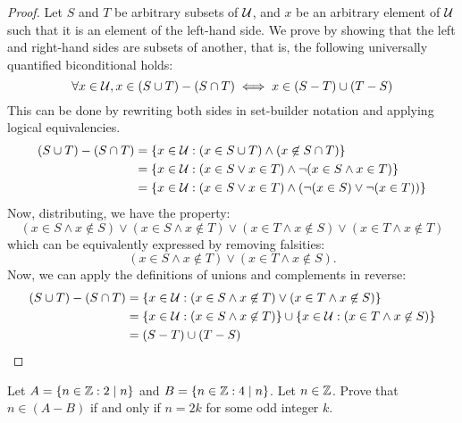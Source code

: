 \begin{proof}
  Let $S$ and $T$ be arbitrary subsets of $\mathcal{U}$, and $x$ be an arbitrary element of $\mathcal{U}$ such that it is an element of the left-hand side.
  We prove by showing that the left and right-hand sides are subsets of another,
  that is, the following universally quantified biconditional holds:
  \begin{equation*}
    \forall x \in \mathcal{U}, x \in (S \cup T)-(S \cap T) \iff x \in (S-T) \cup (T-S)
  \end{equation*}
  This can be done by rewriting both sides in set-builder notation and applying logical equivalencies.
  \begin{align*}
    (S \cup T)-(S \cap T)
     & = \{x\in\mathcal{U} : (x \in S \cup T) \land (x \not\in S \cap T)\}                       \\
     & = \{x\in\mathcal{U} : (x \in S \lor x \in T) \land \lnot (x \in S \land x \in T)\}        \\
     & = \{x\in\mathcal{U} : (x \in S \lor x \in T) \land (\lnot(x \in S) \lor \lnot(x \in T))\}
  \end{align*}
  Now, distributing, we have the property:
  \begin{equation*}
    (x \in S \land x \not\in S) \lor
    (x \in S \land x \not\in T) \lor
    (x \in T \land x \not\in S) \lor
    (x \in T \land x \not\in T)
  \end{equation*}
  which can be equivalently expressed by removing falsities:
  \begin{equation*}
    (x \in S \land x \not\in T) \lor (x \in T \land x \not\in S).
  \end{equation*}
  Now, we can apply the definitions of unions and complements in reverse:
  \begin{align*}
    (S \cup T)-(S \cap T)
     & = \{x\in\mathcal{U}:(x \in S \land x \not\in T) \lor (x \in T \land x \not\in S)\}             \\
     & = \{x\in\mathcal{U}:(x \in S \land x \not\in T)\} \cup \{x\in\mathcal{U}: (x \in T \land x \not\in S)\} \\
     & = (S-T) \cup (T-S) \qedhere
  \end{align*}
\end{proof}


\question Let $A=\{n\in\mathbb{Z} : 2\mid n\}$ and $B=\{n\in\mathbb{Z} : 4\mid n\}$.
Let $n \in \mathbb{Z}$. Prove that $n \in (A-B)$ if and only if $n=2k$ for some odd integer $k$.

